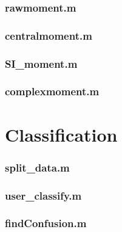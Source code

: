 \subsubsection*{\hypertarget{rawmoment}{rawmoment.m}}


\subsubsection*{\hypertarget{centralmoment}{centralmoment.m}}


\subsubsection*{\hypertarget{simoment}{SI\_moment.m}}


\subsubsection*{\hypertarget{complex}{complexmoment.m}}


\section{Classification}
\subsubsection*{\hypertarget{splitdata}{split\_data.m}}


\subsubsection*{\hypertarget{userclf}{user\_classify.m}}


\subsubsection*{\hypertarget{findconf}{findConfusion.m}}



